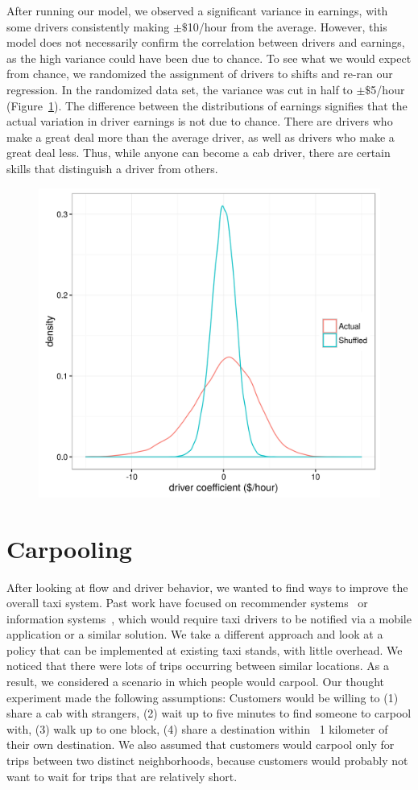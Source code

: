 \documentclass[twocolumn]{article}
\begin{document}
After running our model, we observed a significant variance in earnings, with some drivers consistently making $\pm$$\$$10/hour from the average. However, this model does not necessarily confirm the correlation between drivers and earnings, as the high variance could have been due to chance. To see what we would expect from chance, we randomized the assignment of drivers to shifts and re-ran our regression. In the randomized data set, the variance was cut in half to $\pm$$\$$5/hour (Figure~\ref{fig:efficiency}). The difference between the distributions of earnings signifies that the actual variation in driver earnings is not due to chance. There are drivers who make a great deal more than the average driver, as well as drivers who make a great deal less. Thus, while anyone can become a cab driver, there are certain skills that distinguish a driver from others. 
\begin{figure}[h]
  \centering
  \includegraphics[width=.9\linewidth]{efficiency}
  \label{fig:efficiency}
\end{figure}
\section{Carpooling}
After looking at flow and driver behavior, we wanted to find ways to improve the overall taxi system. Past work have focused on recommender systems~\cite{ZHAN:2014} or information systems~\cite{KIM:2005}, which would require taxi drivers to be notified via a mobile application or a similar solution. We take a different approach and look at a policy that can be implemented at existing taxi stands, with little overhead. We noticed that there were lots of trips occurring between similar locations. As a result, we considered a scenario in which people would carpool. Our thought experiment made the following assumptions: Customers would be willing to (1) share a cab with strangers, (2) wait up to five minutes to find someone to carpool with, (3) walk up to one block, (4) share a destination within ~1 kilometer of their own destination. We also assumed that customers would carpool only for trips between two distinct neighborhoods, because customers would probably not want to wait for trips that are relatively short.
\end{document}

